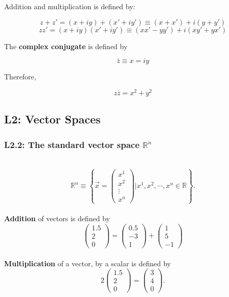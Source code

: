 \documentclass[11pt, oneside]{article}   	%
\begin{document}
Addition and multiplication is defined by: 

\[ z + z' = (x + iy) + (x' + iy') \equiv (x+ x') + i(y + y') \] 
\[ zz' = (x+ iy)(x'+iy') \equiv (xx' - yy') + i(xy' + yx') \]

The \textbf{complex conjugate} is defined by

\[ \bar{z} \equiv x = iy \] 

Therefore, 

\[ z\bar{z} = x^2 + y^2 \]

\subsection{L2: Vector Spaces}

\subsubsection{L2.2: The standard vector space $\mathbb{R}^n$} \mbox{} \\
\[
\mathbb{R}^n \equiv
\left \{ \vec{x} = 
\begin{pmatrix}
x^1 \\ x^2 \\ \vdots \\ x^n
 \end{pmatrix} 
 \Bigg| x^1, x^2, \cdots, x^n \in \mathbb{R} \right\}.
 \] \\
 
 \textbf{Addition} of vectors is defined by \\
 
 \[ \begin{pmatrix} 
 1.5 \\ 2 \\ 0 \end{pmatrix} = \begin{pmatrix} 0.5 \\ -3 \\1 \end{pmatrix} + \begin{pmatrix}  1\\5\\-1 \end{pmatrix} \]\\
 
  \textbf{Multiplication} of a vector, by a scalar is defined by  \\
  
  \[ 2 \begin{pmatrix} 1.5\\2\\0 \end{pmatrix} = \begin{pmatrix} 3\\4\\0\end{pmatrix}. \] \\
  
\end{document}
